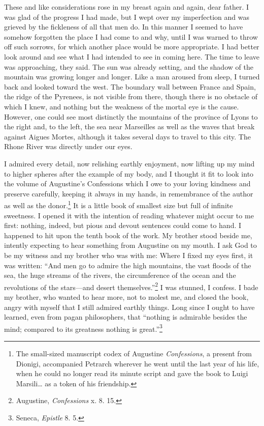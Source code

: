 These and like considerations rose in my breast again and again, dear
father. I was glad of the progress I had made, but I wept over my
imperfection and was grieved by the fickleness of all that men do. In
this manner I seemed to have somehow forgotten the place I had come to
and why, until I was warned to throw off such sorrows, for which
another place would be more appropriate. I had better look around and
see what I had intended to see in coming here. The time to leave was
approaching, they said. The sun was already setting, and the shadow of
the mountain was growing longer and longer. Like a man aroused from
sleep, I turned back and looked toward the west. The boundary wall
between France and Spain, the ridge of the Pyrenees, is not visible
from there, though there is no obstacle of which I knew, and nothing
but the weakness of the mortal eye is the cause. However, one could
see most distinctly the mountains of the province of Lyons to the
right and, to the  left, the sea near Marseilles as well as
the waves that break against Aigues Mortes, although it takes several
days to travel to this city. The Rhone River was directly under our
eyes.

I admired every detail, now relishing earthly enjoyment, now lifting
up my mind to higher spheres after the example of my body, and I
thought it fit to look into the volume of Augustine's Confessions
which I owe to your loving kindness and preserve carefully, keeping it
always in my hands, in remembrance of the author as well as the
donor.\footnote{The small-sized manuscript codex of Augustine
\textit{Confessions}, a present from Dionigi, accompanied Petrarch
wherever he went until the last year of his life, when he could no
longer read its minute script and gave the book to Luigi Marsili\ldots
as a token of his friendship.} It is a little book of smallest size
but full of infinite sweetness. I opened it with the intention of
reading whatever might occur to me first: nothing, indeed, but pious
and devout sentences could come to hand. I happened to hit upon the
tenth book of the work. My brother stood beside me, intently expecting
to hear something from Augustine on my mouth. I ask God to be my
witness and my brother who was with me: Where I fixed my eyes first,
it was written: ``And men go to admire the high mountains, the vast
floods of the sea, the huge streams of the rivers, the circumference
of the ocean and the revolutions of the stars---and desert
themselves.''\footnote{Augustine, \textit{Confessions} x. 8. 15.} I
was stunned, I confess. I bade my brother, who wanted to hear more,
not to molest me, and closed the book, angry with myself that I still
admired earthly things. Long since I ought to have learned, even from
pagan philosophers, that ``nothing is admirable besides the mind;
compared to its greatness nothing is great.''\footnote{Seneca,
\textit{Epistle} 8. 5.}

